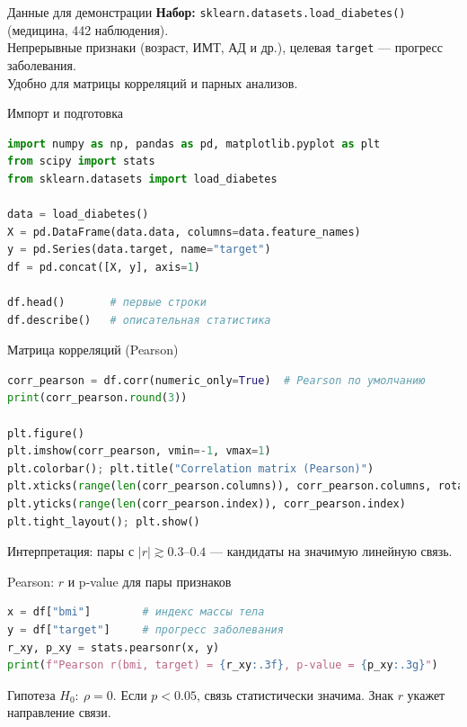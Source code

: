 \documentclass{beamer}
\begin{document}
\begin{frame}{Данные для демонстрации}
\textbf{Набор:} \texttt{sklearn.datasets.load\_diabetes()} (медицина, 442 наблюдения).\\
Непрерывные признаки (возраст, ИМТ, АД и др.), целевая \texttt{target} — прогресс заболевания.\\
Удобно для матрицы корреляций и парных анализов.
\end{frame}

\begin{frame}[fragile]{Импорт и подготовка}
\begin{lstlisting}[language=Python]
import numpy as np, pandas as pd, matplotlib.pyplot as plt
from scipy import stats
from sklearn.datasets import load_diabetes

data = load_diabetes()
X = pd.DataFrame(data.data, columns=data.feature_names)
y = pd.Series(data.target, name="target")
df = pd.concat([X, y], axis=1)

df.head()       # первые строки
df.describe()   # описательная статистика
\end{lstlisting}
\end{frame}

\begin{frame}[fragile]{Матрица корреляций (Pearson)}
\begin{lstlisting}[language=Python]
corr_pearson = df.corr(numeric_only=True)  # Pearson по умолчанию
print(corr_pearson.round(3))

plt.figure()
plt.imshow(corr_pearson, vmin=-1, vmax=1)
plt.colorbar(); plt.title("Correlation matrix (Pearson)")
plt.xticks(range(len(corr_pearson.columns)), corr_pearson.columns, rotation=90)
plt.yticks(range(len(corr_pearson.index)), corr_pearson.index)
plt.tight_layout(); plt.show()
\end{lstlisting}
Интерпретация: пары с $|r|\gtrsim 0.3$–$0.4$ — кандидаты на значимую линейную связь.
\end{frame}


\begin{frame}[fragile]{Pearson: $r$ и p-value для пары признаков}
\begin{lstlisting}[language=Python]
x = df["bmi"]        # индекс массы тела
y = df["target"]     # прогресс заболевания
r_xy, p_xy = stats.pearsonr(x, y)
print(f"Pearson r(bmi, target) = {r_xy:.3f}, p-value = {p_xy:.3g}")
\end{lstlisting}
Гипотеза $H_0{:}\ \rho=0$. Если $p<0.05$, связь статистически значима. Знак $r$ укажет направление связи.
\end{frame}
\end{document}
